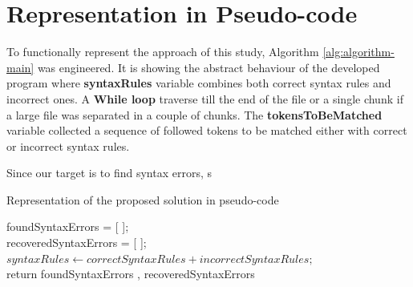 \section{Representation in Pseudo-code}
To functionally represent the approach of this study, Algorithm \ref{alg:algorithm-main} was engineered. It is showing the abstract behaviour of the developed program where \textbf{syntaxRules} variable combines both correct syntax rules and incorrect ones. A \textbf{While loop} traverse till the end of the file or a single chunk if a large file was separated in a couple of chunks. The \textbf{tokensToBeMatched}  variable collected a sequence of followed tokens to be matched either with correct or incorrect syntax rules.

	\vspace{5mm} %
Since our target is to find syntax errors,  s
	\vspace{5mm} %

\begin{algorithm}[H] 
 \caption{Representation of the proposed solution  in pseudo-code}
 \label{alg:algorithm-main}

foundSyntaxErrors = [ ];\\
recoveredSyntaxErrors = [ ];\\
$syntaxRules \leftarrow correctSyntaxRules + incorrectSyntaxRules;$\\
return foundSyntaxErrors , recoveredSyntaxErrors
\end{algorithm}


